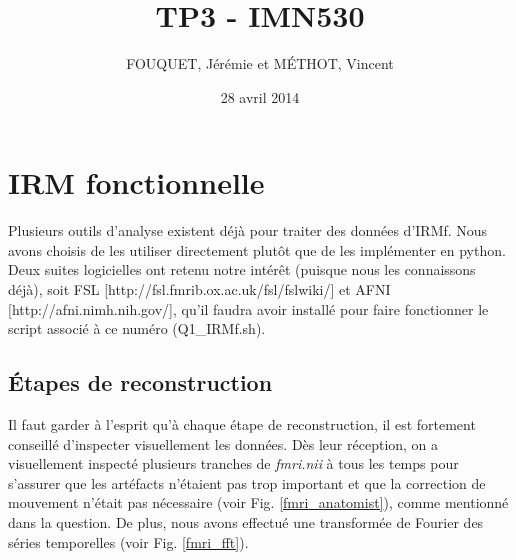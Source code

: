 \documentclass[a4paper]{article}
\title{TP3 - IMN530}
\author{FOUQUET, Jérémie et MÉTHOT, Vincent}
\date{28 avril 2014}
\begin{document}
\maketitle

\section{IRM fonctionnelle}

Plusieurs outils d'analyse existent déjà pour traiter des données d'IRMf. Nous avons choisis de les utiliser directement plutôt que de les implémenter en python. Deux suites logicielles ont retenu notre intérêt (puisque nous les connaissons déjà), soit FSL [http://fsl.fmrib.ox.ac.uk/fsl/fslwiki/] et AFNI [http://afni.nimh.nih.gov/], qu'il faudra avoir installé pour faire fonctionner le script associé à ce numéro (Q1\_IRMf.sh).

\subsection{Étapes de reconstruction}

Il faut garder à l'esprit qu'à chaque étape de reconstruction, il est fortement conseillé d'inspecter visuellement les données. Dès leur réception, on a visuellement inspecté plusieurs tranches de \emph{fmri.nii} à tous les temps pour s'assurer que les artéfacts n'étaient pas trop important et que la correction de mouvement n'était pas nécessaire (voir Fig. \ref{fmri_anatomist}), comme mentionné dans la question. De plus, nous avons effectué une transformée de Fourier des séries temporelles (voir Fig. \ref{fmri_fft}).
\end{document}
